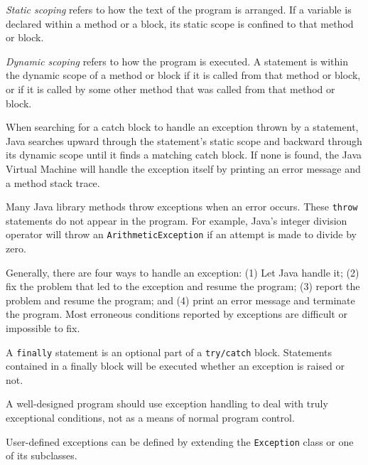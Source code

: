 \begin{SMBL}
\item  {\it Static scoping} refers to how the text of the program
is arranged.  If a variable is declared within a method or a block,
its static scope is confined to that method or block.

\item  {\it Dynamic scoping} refers to how the program is executed.
A statement is within the dynamic scope of a method or block if
it is called from that method or block, or if it is called by some
other method that was called from that method or block.

\item  When searching for a catch block to handle an exception
thrown by a statement, Java searches upward through the
statement's static scope and backward through its dynamic
scope until it finds a matching catch block.  If none is
found, the Java Virtual Machine will handle the exception itself
by printing an error message and a method stack trace.

\item  Many Java library methods throw exceptions when an
error occurs.  These {\tt throw} statements do not appear in the
program.  For example, Java's integer division operator will throw an
{\tt ArithmeticException} if an attempt is made to divide by zero.

\item  Generally, there are four ways to handle an exception: (1)
Let Java handle it; (2) fix the problem that led to the exception and
resume the program; (3) report the problem and resume the program; and
(4) print an error message and terminate the program.  Most erroneous
conditions reported by exceptions are difficult or impossible to fix.

\item  A {\tt finally} statement is an optional part of a
{\tt try/catch} block.  Statements contained in a finally block will be
executed whether an exception is raised or not.

\item  A well-designed program should use exception handling to
deal with truly exceptional conditions, not as a means
of normal program control.

\item  User-defined exceptions can be defined by extending the
{\tt Exception} class or one of its subclasses.
\end{SMBL}


\secANSHleft

